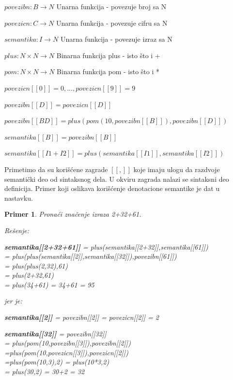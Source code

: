 \documentclass[a4paper]{article}
\newtheorem{primer}{Primer}[section]
\begin{document}
{\begin{tcolorbox}
$povezibn: B \rightarrow N $  \qquad Unarna funkcija - povezuje broj sa N

$povezicn: C \rightarrow N $  \qquad Unarna funkcija - povezuje cifru sa N

$semantika: I \rightarrow N $   \qquad Unarna funkcija - povezuje izraz sa N

$plus: N \times N \rightarrow N $  \qquad Binarna funkcija plus - isto što i +

$pom: N \times N \rightarrow N $ \qquad Binarna funkcija pom - isto što i *

$ povezicn[[0]] = 0,... ,povezicn[[9]] = 9 $

$ povezibn[[D]] = povezicn[[D]] $

$ povezibn[[B D]] = plus(pom(10, povezibn[[B]]),povezibn[[D]]) $

$ semantika[[B]] = povezibn[[B]] $

$ semantika[[I1 + I2]] = plus(semantika[[I1]],semantika[[I2]]) $

\end{tcolorbox}
Primetimo da su korišćene zagrade $ [[,]]$ koje imaju ulogu da razdvoje semantički deo od sintaksnog dela. U okviru zagrada nalazi se sintaksni deo definicija. Primer koji oslikava korišćenje denotacione semantike je dat u nastavku.
\begin{primer}
Pronaći značenje izraza 2+32+61.

Rešenje:
\begin{center}
\textbf{semantika[[2+32+61]]} = plus(semantika[[2+32]],semantika[[61]])\\
= plus(plus(semantika[[2]],semantika[[32]]),povezibn[[61]])\\
= plus(plus(2,32),61)\\
= plus(2+32,61)\\
= plus(34+61) = 34+61 = 95
\end{center}

jer je:

\begin{center}
\textbf{semantika[[2]]} = povezibn[[2]] = povezicn[[2]] = 2
\end{center}
\begin{center}
\textbf{semantika[[32]]} = povezibn[[32]]\\
= plus(pom(10,povezibn[[3]]),povezibn[[2]])\\
=plus(pom(10,povezicn[[3]]),povezicn[[2]]) \\
=plus(pom(10,3),2) = plus(10*3,2)\\
= plus(30,2) = 30+2 = 32\end{center}


\end{primer}}
\end{document}
